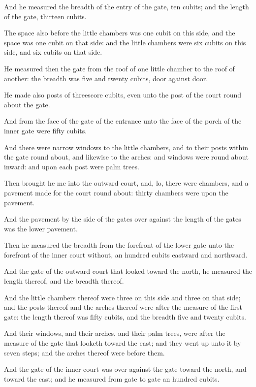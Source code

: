\verse And he measured the breadth of the entry of the gate, ten cubits; and the length of the gate, thirteen cubits.

\verse The space also before the little chambers was one cubit on this side, and the space was one cubit on that side: and the little chambers were six cubits on this side, and six cubits on that side.

\verse He measured then the gate from the roof of one little chamber to the roof of another: the breadth was five and twenty cubits, door against door.

\verse He made also posts of threescore cubits, even unto the post of the court round about the gate.

\verse And from the face of the gate of the entrance unto the face of the porch of the inner gate were fifty cubits.

\verse And there were narrow windows to the little chambers, and to their posts within the gate round about, and likewise to the arches: and windows were round about inward: and upon each post were palm trees.

\verse Then brought he me into the outward court, and, lo, there were chambers, and a pavement made for the court round about: thirty chambers were upon the pavement.

\verse And the pavement by the side of the gates over against the length of the gates was the lower pavement.

\verse Then he measured the breadth from the forefront of the lower gate unto the forefront of the inner court without, an hundred cubits eastward and northward.

\verse And the gate of the outward court that looked toward the north, he measured the length thereof, and the breadth thereof.

\verse And the little chambers thereof were three on this side and three on that side; and the posts thereof and the arches thereof were after the measure of the first gate: the length thereof was fifty cubits, and the breadth five and twenty cubits.

\verse And their windows, and their arches, and their palm trees, were after the measure of the gate that looketh toward the east; and they went up unto it by seven steps; and the arches thereof were before them.

\verse And the gate of the inner court was over against the gate toward the north, and toward the east; and he measured from gate to gate an hundred cubits.

